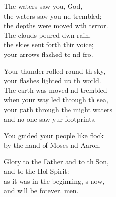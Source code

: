 \begin{psalmverse}
\begin{patverse}
The waters saw you,  God,\Med\\
the waters saw you nd trembled;\\
the depths were moved w\pointup{\i}th terror.\Med\\
The clouds poured dwn rain,\\
the skies sent forth thir voice;\Med\\
your arrows flashed to nd fro.

Your thunder rolled round th sky,\Med\\
your flashes lighted up th world.\\
The earth was moved nd trembled\Med\\
when your way led through th sea,\\
your path through the might waters\Med\\
and no one saw yur footprints.

You guided your people like  flock\Med\\
by the hand of Moses nd Aaron.

Glory to the Father and to th Son,\Med\\
and to the Hol Spirit:\\
as it was in the beginning, \pointup{\i}s now,\Med\\
and will be forever. men.
  \end{patverse}
\end{psalmverse}
